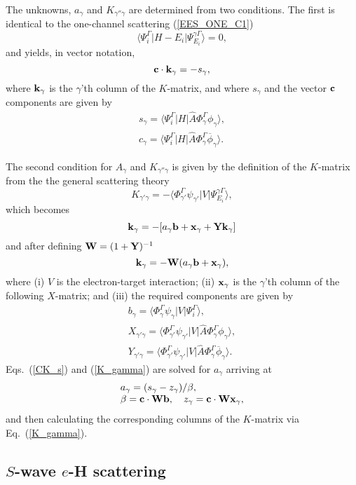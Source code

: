 \documentclass[aip
, pra
, showpacs
, aps
, twocolumn
, groupedaddress
, floatfix
]{revtex4}
\newcommand{\beq}{\begin{equation}}
\newcommand{\eeq}{\end{equation}}
\newcommand{\barr}{\begin{array}}
\newcommand{\earr}{\end{array}}
\newcommand{\vecCT}{ {\bf c} \cdot }
\begin{document}
The unknowns, $a_\gamma$ and $K_{\gamma'' \gamma}$ are determined from two conditions. The first is identical to the one-channel scattering (\ref{EES_ONE_C1})
\beq
\langle\Psi_i^\Gamma|H-E_i|\Psi_{E_i}^{\gamma \Gamma}\rangle=0,
\label{EES_MC_C1} \eeq  %
and yields, in vector notation,
\beq
\vecCT {\bf k}_\gamma = -s_\gamma, \label{CK_s}
\eeq
where ${\bf k}_\gamma$ is the $\gamma$'th column of the $K$-matrix,
and where $s_\gamma$ and the vector ${\bf c}$ components are given by
\beq \barr{l}
s_\gamma = \langle \Psi_i^\Gamma |H| \hat{A} \Phi^\Gamma_{\gamma} \phi_{\gamma} \rangle,\\
c_{\gamma} =  \langle \Psi_i^\Gamma |H | \hat{A} \Phi^\Gamma_{\gamma} \overline{\phi}_{\gamma} \rangle.
\earr \label{Psi_} \eeq


The second condition for $A_\gamma$ and $K_{\gamma'' \gamma}$ is given by the definition of the $K$-matrix from the the general scattering theory \cite{N82}
\beq
K_{\gamma' \gamma} = - \langle \Phi^\Gamma_{\gamma'}  \psi_{\gamma'}
| V | \Psi_{E_i}^{\gamma \Gamma} \rangle,
\eeq
which becomes
\beq
{\bf k}_\gamma = -[a_\gamma {\bf b} + {\bf x}_\gamma + {\bf Y k}_\gamma]
\eeq
and after defining ${\bf W}=(1+{\bf Y})^{-1}$
\beq
{\bf k}_\gamma  = -{\bf W}   (a_\gamma {\bf b}    + {\bf x}_\gamma), \label{K_gamma}
\eeq
where (i) $V$ is the electron-target interaction; (ii) ${\bf x}_\gamma$ is the $\gamma$'th column of the following $X$-matrix;
and (iii) the required components are given by
\beq \barr{l}
b_{\gamma} = \langle \Phi^\Gamma_{\gamma}  \psi_{\gamma} |V |\Psi_i^{\Gamma} \rangle,\\
X_{\gamma' \gamma} = \langle \Phi^\Gamma_{\gamma'}  \psi_{\gamma'} |V | \hat{A} \Phi^\Gamma_{\gamma} \phi_{\gamma} \rangle,\\
Y_{\gamma' \gamma} = \langle \Phi^\Gamma_{\gamma'}  \psi_{\gamma'} |V | \hat{A} \Phi^\Gamma_{\gamma} \overline{\phi}_{\gamma} \rangle.
\earr \label{Y_B_W} \eeq
Eqs.~(\ref{CK_s}) and (\ref{K_gamma}) are solved for $a_\gamma$ arriving at
\beq \barr{l}
a_\gamma = (s_\gamma - z_\gamma) / \beta,\\
\beta = \vecCT {\bf W}  {\bf b}, \ \ \
z_\gamma = \vecCT {\bf W}  {\bf x}_\gamma,
\earr \eeq
and then calculating the corresponding columns of the $K$-matrix via Eq.~(\ref{K_gamma}).



\subsection{$S$-wave $e$-H scattering}
\end{document}
